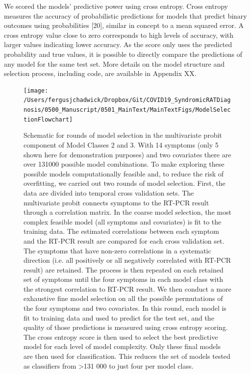 \documentclass[]{elsarticle} %
\begin{document}
We scored the models' predictive power using cross entropy.
Cross entropy measures the accuracy of probabilistic predictions for models that predict binary outcomes using probabilities {[}20{]}, similar in concept to a mean squared error.
A cross entropy value close to zero corresponds to high levels of accuracy, with larger values indicating lower accuracy.
As the score only uses the predicted probability and true values, it is possible to directly compare the predictions of any model for the same test set.
More details on the model structure and selection process, including code, are available in Appendix XX.

\begin{figure}
\texttt{[image: /Users/fergusjchadwick/Dropbox/Git/COVID19\_SyndromicRATDiagnosis/0500\_Manuscript/0501\_MainText/MainTextFigs/ModelSelectionFlowchart]} \caption{Schematic for rounds of model selection in the multivariate probit component of Model Classes 2 and 3. With 14 symptoms (only 5 shown here for demonstration purposes) and two covariates there are over 131000 possible model combinations. To make exploring these possible models computationally feasible and, to reduce the risk of overfitting, we carried out two rounds of model selection. First, the data are divided into temporal cross validation sets. The multivariate probit connects symptoms to the RT-PCR result through a correlation matrix. In the coarse model selection, the most complex feasible model (all symptoms and covariates) is fit to the training data. The estimated correlations between each symptom and the RT-PCR result are compared for each cross validation set. The symptoms that have non-zero correlations in a systematic direction (i.e. all positively or all negatively correlated with RT-PCR result) are retained. The process is then repeated on each retained set of symptoms until the four symptoms in each model class with the strongest correlation to RT-PCR result. We then conduct a more exhaustive fine model selection on all the possible permutations of the four symptoms and two covariates. In this round, each model is fit to training data and used to predict for the test set, and the quality of those predictions is measured using cross entropy scoring. The cross entropy score is then used to select the best predictive model for each level of model complexity. Only these final models are then used for classification. This reduces the set of models tested as classifiers from >131 000 to just four per model class.}\label{fig:modsel-flowchart}
\end{figure}
\end{document}
